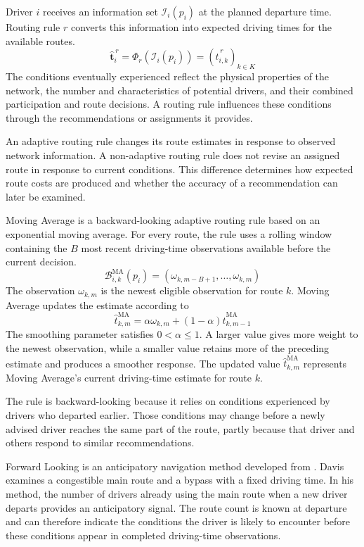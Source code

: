 \documentclass{article}
\begin{document}
Driver $i$ receives an information set $\mathcal I_i(p_i)$ at the planned departure time. Routing rule $r$ converts this information into expected driving times for the available routes.
\[
\widehat{\boldsymbol t}_i^{\,r}
=
\Phi_r\!\left(\mathcal I_i(p_i)\right)
=
\left(\hat t_{i,k}^{\,r}\right)_{k\in K}
\]
The conditions eventually experienced reflect the physical properties of the network, the number and characteristics of potential drivers, and their combined participation and route decisions. A routing rule influences these conditions through the recommendations or assignments it provides.

An adaptive routing rule changes its route estimates in response to observed network information. A non-adaptive routing rule does not revise an assigned route in response to current conditions. This difference determines how expected route costs are produced and whether the accuracy of a recommendation can later be examined.

Moving Average is a backward-looking adaptive routing rule based on an exponential moving average. For every route, the rule uses a rolling window containing the $B$ most recent driving-time observations available before the current decision.
\[
\mathcal B_{i,k}^{\mathrm{MA}}(p_i)
=
\left(
\omega_{k,m-B+1},
\ldots,
\omega_{k,m}
\right)
\]
The observation $\omega_{k,m}$ is the newest eligible observation for route $k$. Moving Average updates the estimate according to
\[
\hat t_{k,m}^{\mathrm{MA}}
=
\alpha\omega_{k,m}
+
(1-\alpha)\hat t_{k,m-1}^{\mathrm{MA}}
\]
The smoothing parameter satisfies $0<\alpha\leq1$. A larger value gives more weight to the newest observation, while a smaller value retains more of the preceding estimate and produces a smoother response. The updated value $\hat t_{k,m}^{\mathrm{MA}}$ represents Moving Average's current driving-time estimate for route $k$.

The rule is backward-looking because it relies on conditions experienced by drivers who departed earlier. Those conditions may change before a newly advised driver reaches the same part of the route, partly because that driver and others respond to similar recommendations.

Forward Looking is an anticipatory navigation method developed from \textcite{davis2009}. Davis examines a congestible main route and a bypass with a fixed driving time. In his method, the number of drivers already using the main route when a new driver departs provides an anticipatory signal. The route count is known at departure and can therefore indicate the conditions the driver is likely to encounter before these conditions appear in completed driving-time observations.
\end{document}
